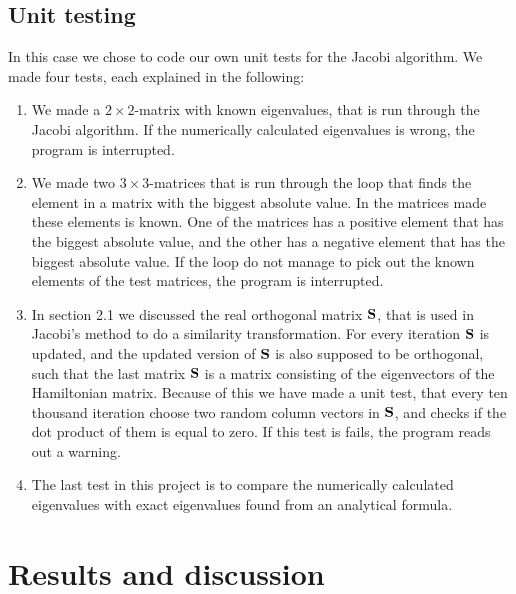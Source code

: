 \documentclass[12pt]{article}
\begin{document}
\begin{flushleft}
\subsection{Unit testing}
In this case we chose to code our own unit tests for the Jacobi algorithm. We made four tests, each explained in the following:
\begin{enumerate}
	\item We made a $2\times 2$-matrix with known eigenvalues, that is run through the Jacobi algorithm. If the numerically calculated eigenvalues is wrong, the program is interrupted.
	\item We made two $3\times 3$-matrices that is run through the loop that finds the element in a matrix with the biggest absolute value. In the matrices made these elements is known. One of the matrices has a positive element that has the biggest absolute value, and the other has a negative element that has the biggest absolute value. If the loop do not manage to pick out the known elements of the test matrices, the program is interrupted.
	\item In section 2.1 we discussed the real orthogonal matrix $\bf S$, that is used in Jacobi's method to do a similarity transformation. For every iteration $\bf S$ is updated, and the updated version of $\bf S$ is also supposed to be orthogonal, such that the last matrix $\bf S$ is a matrix consisting of the eigenvectors of the Hamiltonian matrix. Because of this we have made a unit test, that every ten thousand iteration choose two random column vectors in $\bf S$, and checks if the dot product of them is equal to zero. If this test is fails, the program reads out a warning.
	\item The last test in this project is to compare the numerically calculated eigenvalues with exact eigenvalues found from an analytical formula.  
\end{enumerate}
















\newpage
\section{Results and discussion}

\end{flushleft}
\end{document}
